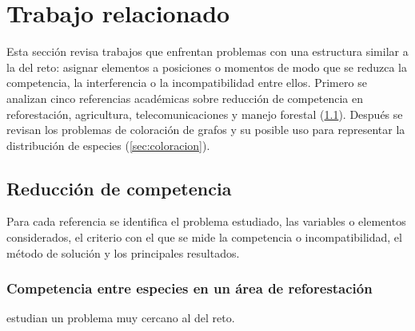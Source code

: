 \section{Trabajo relacionado}
\label{sec:trabajo-relacionado}

Esta sección revisa trabajos que enfrentan problemas con una estructura similar a la del reto: asignar elementos a posiciones o momentos de modo que se reduzca la competencia, la interferencia o la incompatibilidad entre ellos. Primero se analizan cinco referencias académicas sobre reducción de competencia en reforestación, agricultura, telecomunicaciones y manejo forestal (\cref{sec:reduccion-competencia}). Después se revisan los problemas de coloración de grafos y su posible uso para representar la distribución de especies (\cref{sec:coloracion}).

\subsection{Reducción de competencia}
\label{sec:reduccion-competencia}

Para cada referencia se identifica el problema estudiado, las variables o elementos considerados, el criterio con el que se mide la competencia o incompatibilidad, el método de solución y los principales resultados.

\subsubsection{Competencia entre especies en un área de reforestación}

\textcite{elizalde2025} estudian un problema muy cercano al del reto.

